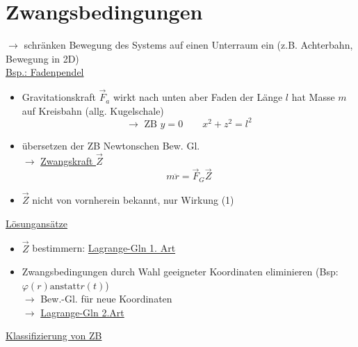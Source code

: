 \documentclass[titlepage,12pt,a4paper,ngerman]{report}
\newcommand{\tx}[1]{\textrm{#1}}
\begin{document}
\section{Zwangsbedingungen}
$ \rightarrow $ schränken Bewegung des Systems auf einen Unterraum ein (z.B. Achterbahn, Bewegung in 2D)\\
\underline{Bsp.: Fadenpendel}\\
\begin{itemize}
	\item Gravitationskraft $ \vec{F}_a $ wirkt nach unten aber Faden der Länge $ l $ hat Masse $ m $ auf Kreisbahn (allg. Kugelschale)\\
	\begin{equation*}
	\rightarrow \tx{ ZB }y = 0 \qquad x^2 +z^2 = l^2 \tag{1}
	\end{equation*}
	\item übersetzen der ZB Newtonschen Bew. Gl.\\
	$ \rightarrow $ \underline{Zwangskraft $ \vec{Z} $}\\
	\begin{equation*}
	m \ddot{r} = \vec{F}_G \vec{Z} \tag{2}
	\end{equation*}
	\item $ \vec{Z} $ nicht von vornherein bekannt, nur Wirkung (1)
\end{itemize}
\underline{Lösungansätze}\\
\begin{itemize}
	\item $ \vec{Z} $ bestimmern: \underline{Lagrange-Gln 1. Art}
	\item  Zwangsbedingungen durch Wahl geeigneter Koordinaten eliminieren (Bsp: $ \varphi(r) \tx{anstatt} r(t) $)\\
	$ \rightarrow $ Bew.-Gl. für neue Koordinaten\\
	$ \rightarrow $ \underline{Lagrange-Gln 2.Art}
\end{itemize}
\underline{Klassifizierung von ZB}\\
\end{document}
